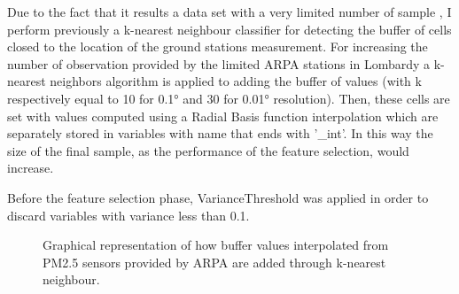 \pagebreak
Due to the fact that it results a data set with a very limited number of sample \cite{zhang2018strategy}, I perform previously a k-nearest neighbour classifier\cite{taunk2019brief} for detecting the buffer of cells closed to the location of the ground stations measurement. For increasing the number of observation provided by the limited ARPA stations in Lombardy a k-nearest neighbors algorithm is applied to adding the buffer of values (with k respectively equal to 10 for 0.1° and 30 for 0.01° resolution).  
Then, these cells are set with values computed using a Radial Basis function interpolation\cite{wright2003radial} which are separately stored in variables with name that ends with '\_int'.\newline
In this way the size of the final sample, as the performance of the feature selection, would increase.
\par
Before the feature selection phase, VarianceThreshold was applied in order to discard variables with variance less than 0.1. 
\begin{figure}[H] \centering
{}
 { \caption{Graphical representation of how buffer values interpolated from PM2.5 sensors provided by ARPA are added through k-nearest neighbour.}}
\end{figure}
